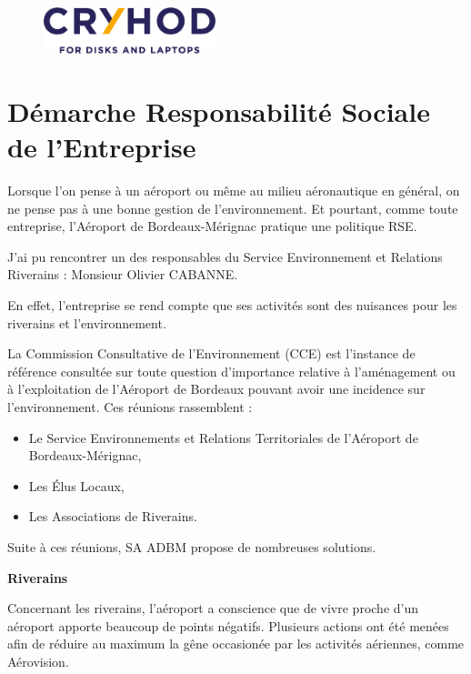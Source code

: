 \begin{figure}[hbt!]
  \centering
  \includegraphics[width=5cm]{Images/logo_cryhod.png}
  \label{fig:logocryhod}
\end{figure}


\newpage

\section{Démarche Responsabilité Sociale de l’Entreprise}


Lorsque l'on pense à un aéroport ou même au milieu aéronautique en général, on ne pense pas à une bonne gestion de l'environnement.
Et pourtant, comme toute entreprise, l'Aéroport de Bordeaux-Mérignac pratique une politique RSE.

J'ai pu rencontrer un des responsables du Service Environnement et Relations Riverains : Monsieur Olivier CABANNE.

En effet, l'entreprise se rend compte que ses activités sont des nuisances pour les riverains et l'environnement. 

La Commission Consultative de l’Environnement (CCE) est l’instance de référence consultée sur toute question d’importance relative à l’aménagement ou à l’exploitation de l’Aéroport de Bordeaux pouvant avoir une incidence sur l’environnement. Ces réunions rassemblent : 

\begin{itemize}
  \item Le Service Environnements et Relations Territoriales de l'Aéroport de Bordeaux-Mérignac,
  \item Les Élus Locaux,
  \item Les Associations de Riverains.
\end{itemize}

Suite à ces réunions, SA ADBM propose de nombreuses solutions.\newline

\textbf{Riverains}\newline

Concernant les riverains, l'aéroport a conscience que de vivre proche d'un aéroport apporte beaucoup de points négatifs.
Plusieurs actions ont été menées afin de réduire au maximum la gêne occasionée par les activités aériennes, comme Aérovision.

